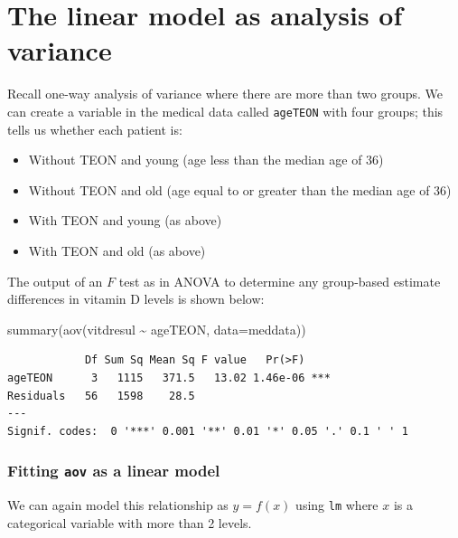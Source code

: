 \documentclass[
  oneside]{krantz}
\newenvironment{Shaded}{\begin{snugshade}}{\end{snugshade}}
\newcommand{\AttributeTok}[1]{\textcolor[rgb]{0.77,0.63,0.00}{#1}}
\newcommand{\FunctionTok}[1]{\textcolor[rgb]{0.00,0.00,0.00}{#1}}
\newcommand{\NormalTok}[1]{#1}
\newcommand{\SpecialCharTok}[1]{\textcolor[rgb]{0.00,0.00,0.00}{#1}}
\providecommand{\tightlist}{%
  \setlength{\itemsep}{0pt}\setlength{\parskip}{0pt}}
\begin{document}
\hypertarget{the-linear-model-as-analysis-of-variance}{%
\section{The linear model as analysis of variance}\label{the-linear-model-as-analysis-of-variance}}

Recall one-way analysis of variance where there are more than two groups. We can create a variable in the medical data called \texttt{ageTEON} with four groups; this tells us whether each patient is:

\begin{itemize}
\tightlist
\item
  Without TEON and young (age less than the median age of 36)
\item
  Without TEON and old (age equal to or greater than the median age of 36)
\item
  With TEON and young (as above)
\item
  With TEON and old (as above)
\end{itemize}

The output of an \(F\) test as in ANOVA to determine any group-based estimate differences in vitamin D levels is shown below:

\begin{Shaded}
\begin{Highlighting}[]
\FunctionTok{summary}\NormalTok{(}\FunctionTok{aov}\NormalTok{(vitdresul }\SpecialCharTok{\textasciitilde{}}\NormalTok{ ageTEON, }\AttributeTok{data=}\NormalTok{meddata))}
\end{Highlighting}
\end{Shaded}

\begin{verbatim}
            Df Sum Sq Mean Sq F value   Pr(>F)    
ageTEON      3   1115   371.5   13.02 1.46e-06 ***
Residuals   56   1598    28.5                     
---
Signif. codes:  0 '***' 0.001 '**' 0.01 '*' 0.05 '.' 0.1 ' ' 1
\end{verbatim}

\hypertarget{fitting-aov-as-a-linear-model}{%
\subsubsection{\texorpdfstring{Fitting \texttt{aov} as a linear model}{Fitting aov as a linear model}}\label{fitting-aov-as-a-linear-model}}

We can again model this relationship as \(y = f(x)\) using \texttt{lm} where \(x\) is a categorical variable with more than 2 levels.
\end{document}
